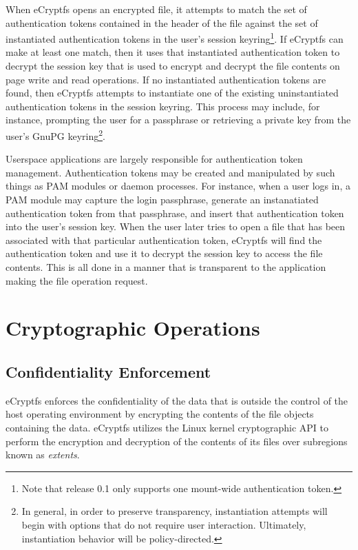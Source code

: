 \documentclass{article}
\begin{document}
When eCryptfs opens an encrypted file, it attempts to match the set of
authentication tokens contained in the header of the file against the
set of instantiated authentication tokens in the user's session
keyring\footnote{Note that release 0.1 only supports one mount-wide
authentication token.}. If eCryptfs can make at least one match, then
it uses that instantiated authentication token to decrypt the session
key that is used to encrypt and decrypt the file contents on page
write and read operations. If no instantiated authentication tokens
are found, then eCryptfs attempts to instantiate one of the existing
uninstantiated authentication tokens in the session keyring. This
process may include, for instance, prompting the user for a passphrase
or retrieving a private key from the user's GnuPG keyring\footnote{In
general, in order to preserve transparency, instantiation attempts
will begin with options that do not require user interaction.
Ultimately, instantiation behavior will be policy-directed.}.

Userspace applications are largely responsible for authentication
token management. Authentication tokens may be created and manipulated
by such things as PAM modules or daemon processes. For instance, when
a user logs in, a PAM module may capture the login passphrase,
generate an instanatiated authentication token from that passphrase,
and insert that authentication token into the user's session key. When
the user later tries to open a file that has been associated with that
particular authentication token, eCryptfs will find the authentication
token and use it to decrypt the session key to access the file
contents. This is all done in a manner that is transparent to the
application making the file operation request.

\section*{Cryptographic Operations}

\subsection*{Confidentiality Enforcement}

eCryptfs enforces the confidentiality of the data that is outside the
control of the host operating environment by encrypting the contents
of the file objects containing the data. eCryptfs utilizes the Linux
kernel cryptographic API to perform the encryption and decryption of
the contents of its files over subregions known as \emph{extents}.
\end{document}
